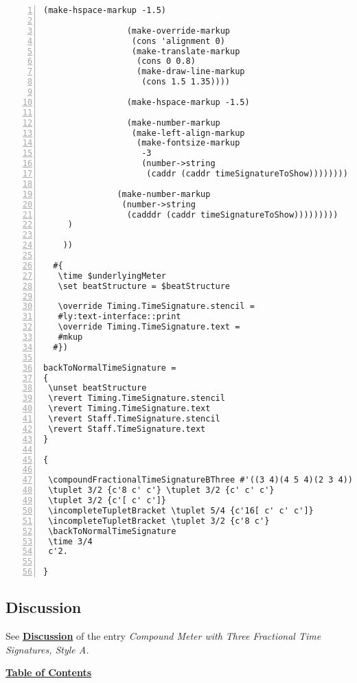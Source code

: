 \begin{Verbatim}[numbers=left,xleftmargin=5mm]
                 (make-hspace-markup -1.5)

                 (make-override-markup
                  (cons 'alignment 0)
                  (make-translate-markup
                   (cons 0 0.8)
                   (make-draw-line-markup
                    (cons 1.5 1.35))))

                 (make-hspace-markup -1.5)

                 (make-number-markup
                  (make-left-align-markup
                   (make-fontsize-markup
                    -3
                    (number->string
                     (caddr (caddr timeSignatureToShow))))))))

               (make-number-markup
                (number->string
                 (cadddr (caddr timeSignatureToShow)))))))))
     )

    ))

  #{
   \time $underlyingMeter
   \set beatStructure = $beatStructure

   \override Timing.TimeSignature.stencil =
   #ly:text-interface::print
   \override Timing.TimeSignature.text =
   #mkup
  #})

backToNormalTimeSignature =
{
 \unset beatStructure
 \revert Timing.TimeSignature.stencil
 \revert Timing.TimeSignature.text
 \revert Staff.TimeSignature.stencil
 \revert Staff.TimeSignature.text
}

{

 \compoundFractionalTimeSignatureBThree #'((3 4)(4 5 4)(2 3 4)) 67/60 3,3,3,4,2
 \tuplet 3/2 {c'8 c' c'} \tuplet 3/2 {c' c' c'}
 \tuplet 3/2 {c'[ c' c']}
 \incompleteTupletBracket \tuplet 5/4 {c'16[ c' c' c']}
 \incompleteTupletBracket \tuplet 3/2 {c'8 c'}
 \backToNormalTimeSignature
 \time 3/4
 c'2.

}
\end{Verbatim}


\subsection{Discussion}
See \hyperref[sec:compoundfractionalmeter_discussion_two]{\textbf{Discussion}} of the entry \textit{Compound Meter with Three Fractional Time Signatures, Style A.}


\hyperref[sec:toc]{\textbf{Table of Contents}}

\vfill \break








